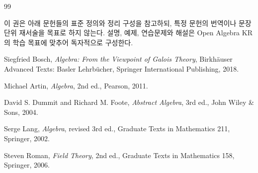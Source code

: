 \renewcommand{\bibname}{참고문헌}
\begin{thebibliography}{99}

\item[]
이 권은 아래 문헌들의 표준 정의와 정리 구성을 참고하되, 특정 문헌의 번역이나 문장 단위 재서술을 목표로 하지 않는다. 설명, 예제, 연습문제와 해설은 Open Algebra KR의 학습 목표에 맞추어 독자적으로 구성한다.

Siegfried Bosch,
\emph{Algebra: From the Viewpoint of Galois Theory},
Birkh\"auser Advanced Texts: Basler Lehrb\"ucher,
Springer International Publishing, 2018.

Michael Artin,
\emph{Algebra}, 2nd ed.,
Pearson, 2011.

David S. Dummit and Richard M. Foote,
\emph{Abstract Algebra}, 3rd ed.,
John Wiley \& Sons, 2004.

Serge Lang,
\emph{Algebra}, revised 3rd ed.,
Graduate Texts in Mathematics 211,
Springer, 2002.

Steven Roman,
\emph{Field Theory}, 2nd ed.,
Graduate Texts in Mathematics 158,
Springer, 2006.

\end{thebibliography}
